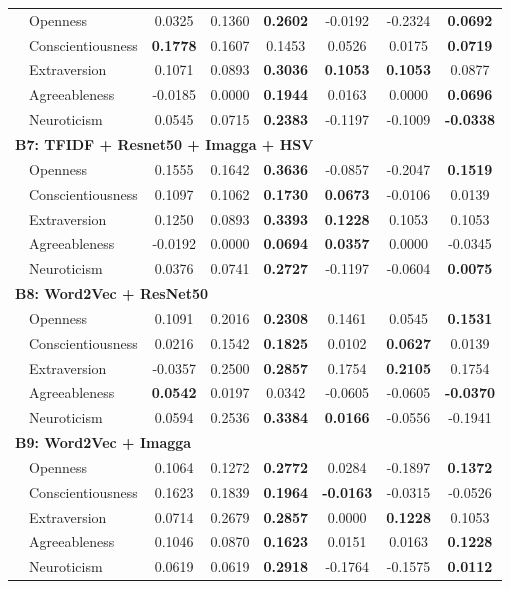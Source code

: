 \begin{longtable}{llcccccc}
& Openness & 0.0325 & 0.1360 & \textbf{0.2602} & -0.0192 & -0.2324 & \textbf{0.0692} \\
& Conscientiousness & \textbf{0.1778} & 0.1607 & 0.1453 & 0.0526 & 0.0175 & \textbf{0.0719} \\
& Extraversion & 0.1071 & 0.0893 & \textbf{0.3036} & \textbf{0.1053} & \textbf{0.1053} & 0.0877 \\
& Agreeableness & -0.0185 & 0.0000 & \textbf{0.1944} & 0.0163 & 0.0000 & \textbf{0.0696} \\
& Neuroticism & 0.0545 & 0.0715 & \textbf{0.2383} & -0.1197 & -0.1009 & \textbf{-0.0338} \\

\hline
\multicolumn{8}{l}{\textbf{B7: TFIDF + Resnet50 + Imagga + HSV}} \\

& Openness & 0.1555 & 0.1642 & \textbf{0.3636} & -0.0857 & -0.2047 & \textbf{0.1519} \\
& Conscientiousness & 0.1097 & 0.1062 & \textbf{0.1730} & \textbf{0.0673} & -0.0106 & 0.0139 \\
& Extraversion & 0.1250 & 0.0893 & \textbf{0.3393} & \textbf{0.1228} & 0.1053 & 0.1053 \\
& Agreeableness & -0.0192 & 0.0000 & \textbf{0.0694} & \textbf{0.0357} & 0.0000 & -0.0345 \\
& Neuroticism & 0.0376 & 0.0741 & \textbf{0.2727} & -0.1197 & -0.0604 & \textbf{0.0075} \\

\hline
\multicolumn{8}{l}{\textbf{B8: Word2Vec + ResNet50}} \\

& Openness & 0.1091 & 0.2016 & \textbf{0.2308} & 0.1461 & 0.0545 & \textbf{0.1531} \\
& Conscientiousness & 0.0216 & 0.1542 & \textbf{0.1825} & 0.0102 & \textbf{0.0627} & 0.0139 \\
& Extraversion & -0.0357 & 0.2500 & \textbf{0.2857} & 0.1754 & \textbf{0.2105} & 0.1754 \\
& Agreeableness & \textbf{0.0542} & 0.0197 & 0.0342 & -0.0605 & -0.0605 & \textbf{-0.0370} \\
& Neuroticism & 0.0594 & 0.2536 & \textbf{0.3384} & \textbf{0.0166} & -0.0556 & -0.1941 \\

\hline
\multicolumn{8}{l}{\textbf{B9: Word2Vec + Imagga}} \\

& Openness & 0.1064 & 0.1272 & \textbf{0.2772} & 0.0284 & -0.1897 & \textbf{0.1372} \\
& Conscientiousness & 0.1623 & 0.1839 & \textbf{0.1964} & \textbf{-0.0163} & -0.0315 & -0.0526 \\
& Extraversion & 0.0714 & 0.2679 & \textbf{0.2857} & 0.0000 & \textbf{0.1228} & 0.1053 \\
& Agreeableness & 0.1046 & 0.0870 & \textbf{0.1623} & 0.0151 & 0.0163 & \textbf{0.1228} \\
& Neuroticism & 0.0619 & 0.0619 & \textbf{0.2918} & -0.1764 & -0.1575 & \textbf{0.0112} \\


\end{longtable}
